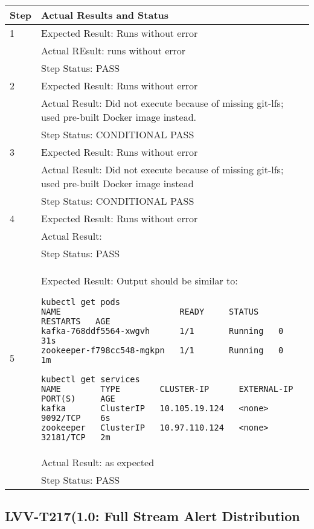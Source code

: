 \documentclass[DM,lsstdraft,STR,toc]{lsstdoc}
\begin{document}
\begin{longtable}{p{2cm}p{14cm}}
\hline
{Step} & {Actual Results and Status}\\ \hline
1 & Expected Result: Runs without error \\\cline{2-2}
  & Actual REsult: runs without error \\\cline{2-2}
  & Step Status: PASS \\\hline
2 & Expected Result: Runs without error \\\cline{2-2}
  & Actual Result: Did not execute because of missing git-lfs; used pre-built Docker image instead. \\\cline{2-2}
  & Step Status: CONDITIONAL PASS \\\hline
3 & Expected Result: Runs without error \\\cline{2-2}
  & Actual Result: Did not execute because of missing git-lfs; used pre-built Docker image instead \\\cline{2-2}
  & Step Status: CONDITIONAL PASS \\\hline
4 & Expected Result: Runs without error \\\cline{2-2}
  & Actual Result: \\\cline{2-2}
  & Step Status: PASS \\\hline
5 & Expected Result: Output should be similar to:

\scriptsize{
\begin{verbatim}
kubectl get pods
NAME                        READY     STATUS    RESTARTS   AGE
kafka-768ddf5564-xwgvh      1/1       Running   0          31s
zookeeper-f798cc548-mgkpn   1/1       Running   0          1m

kubectl get services
NAME        TYPE        CLUSTER-IP      EXTERNAL-IP   PORT(S)     AGE
kafka       ClusterIP   10.105.19.124   <none>        9092/TCP    6s
zookeeper   ClusterIP   10.97.110.124   <none>        32181/TCP   2m
\end{verbatim}
}

\\\cline{2-2}
  & Actual Result: as expected \\\cline{2-2}
  & Step Status: PASS \\\hline
\end{longtable}


\subsection{LVV-T217(1.0: Full Stream Alert Distribution}
\label{sect:detail-lvv-t216}
\end{document}
